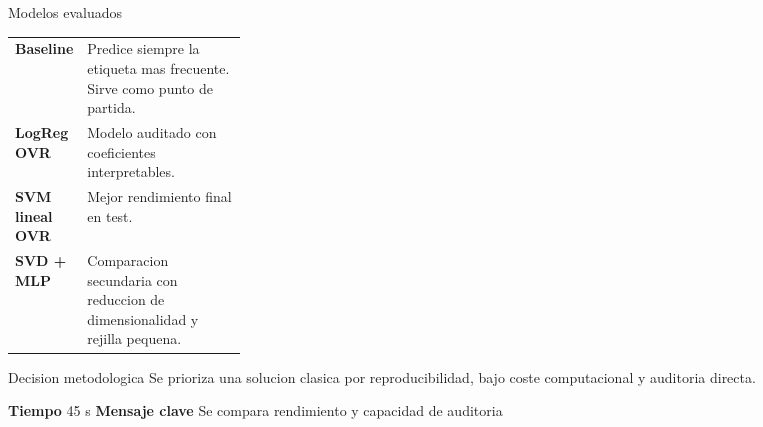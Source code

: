 \documentclass[aspectratio=169,10pt]{beamer}
\newcommand{\slidemeta}[2]{
  \vfill
  {\scriptsize\color{Muted}\textbf{Tiempo} #1 \hfill \textbf{Mensaje clave} #2}
}
\begin{document}
\begin{frame}{Modelos evaluados}
  \begin{tabularx}{\linewidth}{>{\bfseries}p{0.27\linewidth}X}
    \toprule
    Baseline & Predice siempre la etiqueta mas frecuente. Sirve como punto de partida.\\
    LogReg OVR & Modelo auditado con coeficientes interpretables.\\
    SVM lineal OVR & Mejor rendimiento final en test.\\
    SVD + MLP & Comparacion secundaria con reduccion de dimensionalidad y rejilla pequena.\\
    \bottomrule
  \end{tabularx}
  \vspace{0.25cm}
  \begin{block}{Decision metodologica}
    Se prioriza una solucion clasica por reproducibilidad, bajo coste computacional y auditoria directa.
  \end{block}
  \slidemeta{45 s}{Se compara rendimiento y capacidad de auditoria}
\end{frame}
\end{document}
